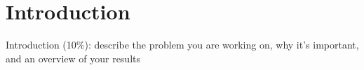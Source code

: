 \section{Introduction}
Introduction (10\%): describe the problem you are working on, why it's important, and an overview of your results
